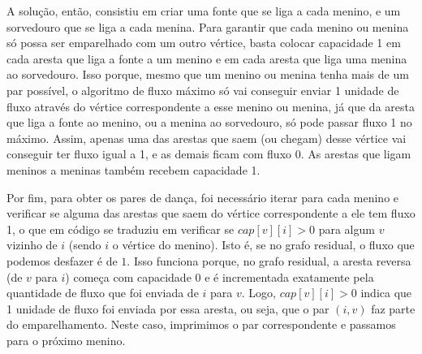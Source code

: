 \documentclass[12pt,a4paper]{article}
\begin{document}
A solução, então, consistiu em criar uma fonte que se liga a cada menino, e um sorvedouro que se liga a cada menina.
Para garantir que cada menino ou menina só possa ser emparelhado com um outro vértice, basta colocar capacidade 1 em cada
aresta que liga a fonte a um menino e em cada aresta que liga uma menina ao sorvedouro. Isso porque, mesmo que um menino ou
menina tenha mais de um par possível, o algoritmo de fluxo máximo só vai conseguir enviar 1 unidade de fluxo através do
vértice correspondente a esse menino ou menina, já que da aresta que liga a fonte ao menino, ou a menina ao sorvedouro,
só pode passar fluxo 1 no máximo. Assim, apenas uma das arestas que saem (ou chegam) desse vértice vai conseguir ter
fluxo igual a 1, e as demais ficam com fluxo 0. As arestas que ligam meninos a meninas também recebem capacidade 1.

Por fim, para obter os pares de dança, foi necessário iterar para cada menino e verificar
se alguma das arestas que saem do vértice correspondente a ele tem fluxo 1, o que em código
se traduziu em verificar se $cap[v][i] > 0$ para algum $v$ vizinho de $i$ (sendo $i$ o vértice do menino). Isto é,
se no grafo residual, o fluxo que podemos desfazer é de $1$. Isso funciona porque, no grafo residual, a aresta reversa
(de $v$ para $i$) começa com capacidade 0 e é incrementada exatamente pela quantidade de fluxo que foi enviada de
$i$ para $v$. Logo, $cap[v][i] > 0$ indica que 1 unidade de fluxo foi enviada por essa aresta, ou seja, que o par
$(i, v)$ faz parte do emparelhamento. Neste caso, imprimimos o par correspondente e passamos para o próximo menino.
\end{document}
